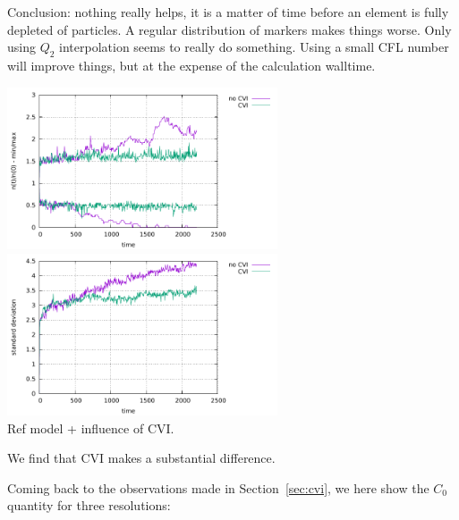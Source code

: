 Conclusion: nothing really helps, it is a matter of time before an element is fully depleted of particles. 
A regular distribution of markers makes things worse. Only using $Q_2$ interpolation seems to really do 
something. Using a small CFL number will improve things, but at the expense of the calculation walltime. 


\begin{center}
\includegraphics[width=8cm]{python_codes/fieldstone_30/results_solcx/markercount_cvi}
\includegraphics[width=8cm]{python_codes/fieldstone_30/results_solcx/stdev_cvi}\\
{\captionfont Ref model + influence of CVI.} 
\end{center}

We find that CVI makes a substantial difference. 


Coming back to the observations made in Section~\ref{sec:cvi}, 
we here show the $C_0$ quantity for three resolutions:

